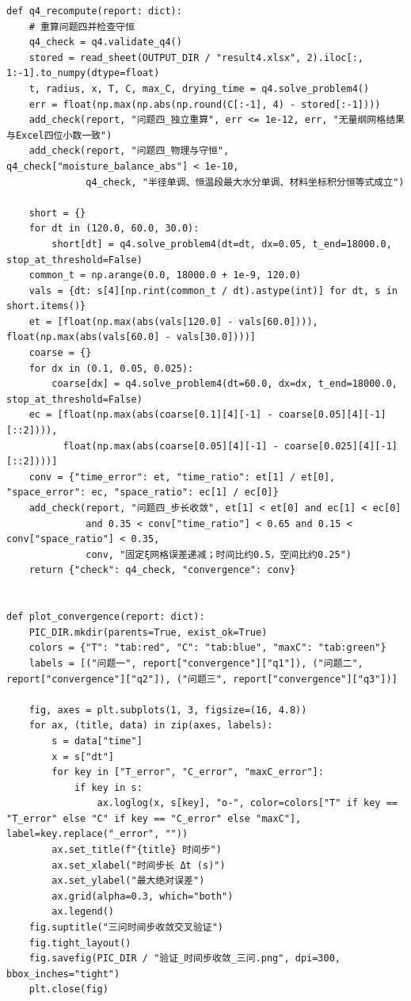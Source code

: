 \documentclass[withoutpreface,bwprint]{cumcm_thesis}
\begin{document}
\begin{appendices}
\begin{lstlisting}
def q4_recompute(report: dict):
    # 重算问题四并检查守恒
    q4_check = q4.validate_q4()
    stored = read_sheet(OUTPUT_DIR / "result4.xlsx", 2).iloc[:, 1:-1].to_numpy(dtype=float)
    t, radius, x, T, C, max_C, drying_time = q4.solve_problem4()
    err = float(np.max(np.abs(np.round(C[:-1], 4) - stored[:-1])))
    add_check(report, "问题四_独立重算", err <= 1e-12, err, "无量纲网格结果与Excel四位小数一致")
    add_check(report, "问题四_物理与守恒", q4_check["moisture_balance_abs"] < 1e-10,
              q4_check, "半径单调、恒温段最大水分单调、材料坐标积分恒等式成立")

    short = {}
    for dt in (120.0, 60.0, 30.0):
        short[dt] = q4.solve_problem4(dt=dt, dx=0.05, t_end=18000.0, stop_at_threshold=False)
    common_t = np.arange(0.0, 18000.0 + 1e-9, 120.0)
    vals = {dt: s[4][np.rint(common_t / dt).astype(int)] for dt, s in short.items()}
    et = [float(np.max(abs(vals[120.0] - vals[60.0]))), float(np.max(abs(vals[60.0] - vals[30.0])))]
    coarse = {}
    for dx in (0.1, 0.05, 0.025):
        coarse[dx] = q4.solve_problem4(dt=60.0, dx=dx, t_end=18000.0, stop_at_threshold=False)
    ec = [float(np.max(abs(coarse[0.1][4][-1] - coarse[0.05][4][-1][::2]))),
          float(np.max(abs(coarse[0.05][4][-1] - coarse[0.025][4][-1][::2])))]
    conv = {"time_error": et, "time_ratio": et[1] / et[0], "space_error": ec, "space_ratio": ec[1] / ec[0]}
    add_check(report, "问题四_步长收敛", et[1] < et[0] and ec[1] < ec[0]
              and 0.35 < conv["time_ratio"] < 0.65 and 0.15 < conv["space_ratio"] < 0.35,
              conv, "固定ξ网格误差递减；时间比约0.5，空间比约0.25")
    return {"check": q4_check, "convergence": conv}


def plot_convergence(report: dict):
    PIC_DIR.mkdir(parents=True, exist_ok=True)
    colors = {"T": "tab:red", "C": "tab:blue", "maxC": "tab:green"}
    labels = [("问题一", report["convergence"]["q1"]), ("问题二", report["convergence"]["q2"]), ("问题三", report["convergence"]["q3"])]

    fig, axes = plt.subplots(1, 3, figsize=(16, 4.8))
    for ax, (title, data) in zip(axes, labels):
        s = data["time"]
        x = s["dt"]
        for key in ["T_error", "C_error", "maxC_error"]:
            if key in s:
                ax.loglog(x, s[key], "o-", color=colors["T" if key == "T_error" else "C" if key == "C_error" else "maxC"], label=key.replace("_error", ""))
        ax.set_title(f"{title} 时间步")
        ax.set_xlabel("时间步长 Δt (s)")
        ax.set_ylabel("最大绝对误差")
        ax.grid(alpha=0.3, which="both")
        ax.legend()
    fig.suptitle("三问时间步收敛交叉验证")
    fig.tight_layout()
    fig.savefig(PIC_DIR / "验证_时间步收敛_三问.png", dpi=300, bbox_inches="tight")
    plt.close(fig)


\end{lstlisting}
\end{appendices}
\end{document}
